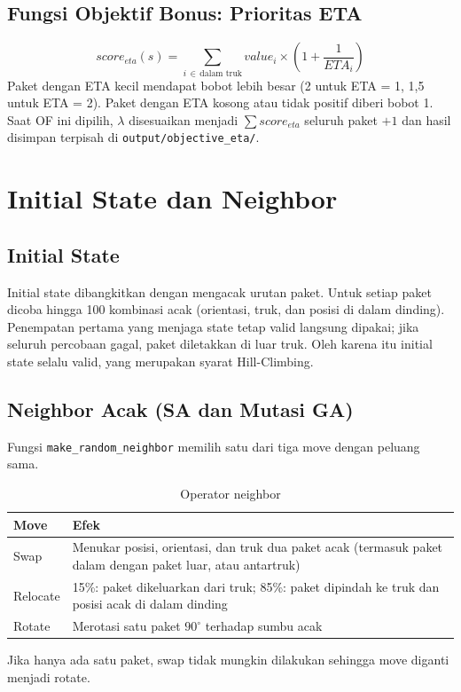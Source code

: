 \documentclass[12pt,a4paper]{report}
\newcommand{\hd}[1]{\cellcolor{hdr}\textbf{#1}}
\newcommand{\code}[1]{\texttt{\small #1}}
\begin{document}
\subsection{Fungsi Objektif Bonus: Prioritas ETA}
\[
score_{eta}(s) = \sum_{i \,\in\, \text{dalam truk}} value_i \times \left(1 + \frac{1}{ETA_i}\right)
\]
Paket dengan ETA kecil mendapat bobot lebih besar (2 untuk ETA = 1, 1,5 untuk ETA = 2). Paket
dengan ETA kosong atau tidak positif diberi bobot 1. Saat OF ini dipilih, $\lambda$ disesuaikan
menjadi $\sum score_{eta}$ seluruh paket $+ 1$ dan hasil disimpan terpisah di \code{output/objective\_eta/}.

\section{Initial State dan Neighbor}
\subsection{Initial State}
Initial state dibangkitkan dengan mengacak urutan paket. Untuk setiap paket dicoba hingga 100
kombinasi acak (orientasi, truk, dan posisi di dalam dinding). Penempatan pertama yang menjaga
state tetap valid langsung dipakai; jika seluruh percobaan gagal, paket diletakkan di luar truk.
Oleh karena itu initial state selalu valid, yang merupakan syarat Hill-Climbing.

\subsection{Neighbor Acak (SA dan Mutasi GA)}
Fungsi \code{make\_random\_neighbor} memilih satu dari tiga move dengan peluang sama.

\begin{table}[H]
\centering
\caption{Operator neighbor}\label{tab:move}
\small
\begin{tabular}{|L{2.4cm}|L{10.8cm}|}
\hline
\hd{Move} & \hd{Efek} \\ \hline
Swap & Menukar posisi, orientasi, dan truk dua paket acak (termasuk paket dalam dengan paket luar, atau antartruk) \\ \hline
Relocate & 15\%: paket dikeluarkan dari truk; 85\%: paket dipindah ke truk dan posisi acak di dalam dinding \\ \hline
Rotate & Merotasi satu paket $90^\circ$ terhadap sumbu acak \\ \hline
\end{tabular}
\end{table}
Jika hanya ada satu paket, swap tidak mungkin dilakukan sehingga move diganti menjadi rotate.
\end{document}
